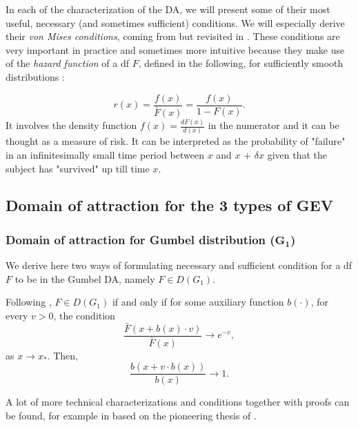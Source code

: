 In each of the characterization of the DA, we will present some of their most useful, necessary (and sometimes sufficient) conditions. We will especially derive their \emph{von Mises conditions}, coming from \cite{von_mises_distribution_1936} but revisited in \cite{falk_von_1993}. These conditions are very important in practice and sometimes more intuitive because they make use of the \emph{hazard function} of a df $F$, defined in the following, for sufficiently smooth distributions :

\begin{equation}\label{haz}
r(x)=\frac{f(x)}{\bar{F}(x)}= \frac{f(x)}{1-F(x)}.
\end{equation}
It involves the density function $f(x)=\frac{dF(x)}{d(x)}$ in the numerator and it can be thought as a measure of risk. It can be interpreted as the probability of "failure" in an infinitesimally small time period between $x$ and $x$ + $\delta x$ given
that the subject has "survived" up till time $x$.


\subsection{Domain of attraction for the 3 types of GEV}


\subsubsection*{Domain of attraction for Gumbel distribution ($\mathbf{G_1}$) }  We derive here two ways of formulating necessary and sufficient condition for a df $F$ to be in the Gumbel DA, namely $F\in D(G_1)$.

\begin{theorem} Following \cite[pp.72]{beirlant_statistics_2006},
	$F\in D(G_1)$ if and only if for some auxiliary function $b(\cdot )$, for every $v>0$, the condition
	\begin{equation}
	\frac{\bar{F}(x+b(x)\cdot v)}{\bar{F}(x)} \to e^{-v},
	\end{equation}
    as $x\to x_*$. Then, 
	\begin{equation*}
	\frac{b(x+v\cdot b(x))}{b(x)}\to 1 .
	\end{equation*} 
\end{theorem}

A lot of more technical characterizations and conditions together with proofs can be found, for example in \citet[pp.20-33]{haan_extreme_2006} based on the pioneering thesis of \citet{haan_regular_1970}. 

